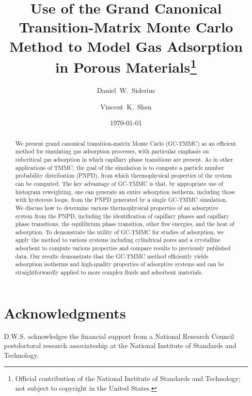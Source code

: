 \documentclass[preprint,prb,showkeys]{revtex4}%
\begin{document}
\title{Use of the Grand Canonical Transition-Matrix Monte Carlo Method to Model Gas Adsorption in Porous Materials\footnote{Official contribution of the National Institute of Standards and Technology; not subject to copyright in the United States.}}
\author{Daniel~W.~Siderius}
\author{Vincent~K.~Shen}


\date{\today}

\begin{abstract}
  We present grand canonical transition-matrix Monte Carlo (GC-TMMC) as an efficient method for simulating gas adsorption processes, with particular emphasis on subcritical gas adsorption in which capillary phase transitions are present.
  As in other applications of TMMC, the goal of the simulation is to compute a particle number probability distribution (PNPD), from which thermophysical properties of the system can be computed.
  The key advantage of GC-TMMC is that, by appropriate use of histogram reweighting, one can generate an entire adsorption isotherm, including those with hysteresis loops, from the PNPD generated by a single GC-TMMC simulation.
  We discuss how to determine various thermophysical properties of an adsorptive system from the PNPD, including the identification of capillary phases and capillary phase transitions, the equilibrium phase transition, other free energies, and the heat of adsorption.
  To demonstrate the utility of GC-TMMC for studies of adsorption, we apply the method to various systems including cylindrical pores and a crystalline adsorbent to compute various properties and compare results to previously published data.
  Our results demonstrate that the GC-TMMC method efficiently yields adsorption isotherms and high-quality properties of adsorptive systems and can be straightforwardly applied to more complex fluids and adsorbent materials.
\end{abstract}%

\maketitle

\newpage








\section*{Acknowledgments}
D.W.S. acknowledges the financial support from a National Research Council postdoctoral research associateship at the National Institute of Standards and Technology.

%
%


\end{document}
